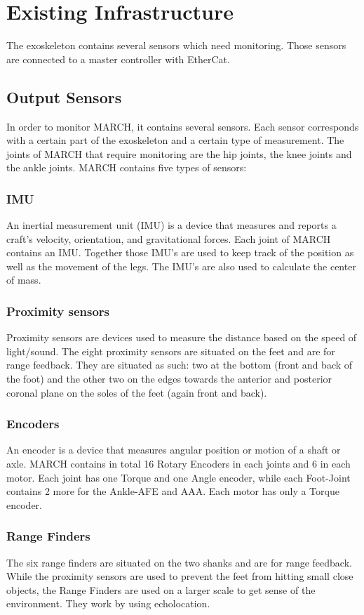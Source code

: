 \section{Existing Infrastructure}\label{sec:infra}
The exoskeleton contains several sensors which need monitoring. Those sensors are connected to a master controller with EtherCat. 

\subsection{Output Sensors}
In order to monitor MARCH, it contains several sensors. Each sensor corresponds with a certain part of the exoskeleton and a certain type of measurement. The joints of MARCH that require monitoring are the hip joints, the knee joints and the ankle joints. MARCH contains five types of sensors:
\subsubsection{IMU}
An inertial measurement unit (IMU) is a device that measures and reports a craft's velocity, orientation, and gravitational forces. Each joint of MARCH contains an IMU. Together those IMU's are used to keep track of the position as well as the movement of the legs. The IMU's are also used to calculate the center of mass. 
\subsubsection{Proximity sensors}
Proximity sensors are devices used to measure the distance based on the speed of light/sound. The eight proximity sensors are situated on the feet and are for range feedback. They are situated as such: two at the bottom (front and back of the foot) and the other two on the edges towards the anterior and posterior coronal plane on the soles of the feet (again front and back). 

\subsubsection{Encoders}
An encoder is a device that measures angular position or motion of a shaft or axle. MARCH contains in total 16 Rotary Encoders in each joints and 6 in each motor. Each joint has one Torque and one Angle encoder, while each Foot-Joint contains 2 more for the Ankle-AFE and AAA. Each motor has only a Torque encoder.
\subsubsection{Range Finders}
The six range finders are situated on the two shanks and are for range feedback. While the proximity sensors are used to prevent the feet from hitting small close objects, the Range Finders are used on a larger scale to get sense of the environment. They work by using echolocation.
